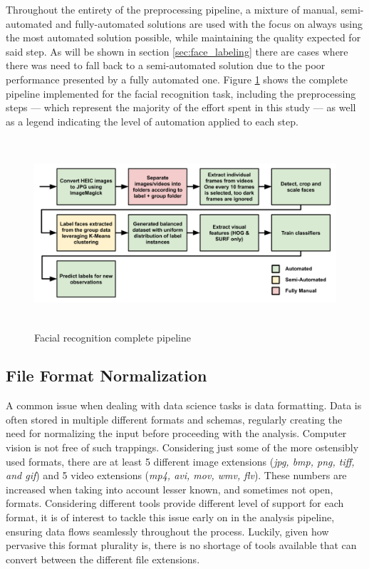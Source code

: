 \documentclass[11pt]{article}
\begin{document}
    Throughout the entirety of the preprocessing pipeline, a mixture of manual, semi-automated and fully-automated solutions are used with the focus on always using the most automated solution possible, while maintaining the quality expected for said step. As will be shown in section \ref{sec:face_labeling} there are cases where there was need to fall back to a semi-automated solution due to the poor performance presented by a fully automated one. Figure \ref{fig:preprocess:pipeline} shows the complete pipeline implemented for the facial recognition task, including the preprocessing steps --- which represent the majority of the effort spent in this study --- as well as a legend indicating the level of automation applied to each step.

    \begin{figure}[ht]
        \centering
        \includegraphics[height=7cm]{./Images/preprocessing/pipeline.png}
        \caption{Facial recognition complete pipeline}
        \label{fig:preprocess:pipeline}
    \end{figure}

    \subsection{File Format Normalization}
        A common issue when dealing with data science tasks is data formatting. Data is often stored in multiple different formats and schemas, regularly creating the need for normalizing the input before proceeding with the analysis. Computer vision is not free of such trappings. Considering just some of the more ostensibly used formats, there are at least 5 different image extensions (\textit{jpg, bmp, png, tiff, and gif}) and 5 video extensions (\textit{mp4, avi, mov, wmv, flv}). These numbers are increased when taking into account lesser known, and sometimes not open, formats. Considering different tools provide different level of support for each format, it is of interest to tackle this issue early on in the analysis pipeline, ensuring data flows seamlessly throughout the process. Luckily, given how pervasive this format plurality is, there is no shortage of tools available that can convert between the different file extensions.
\end{document}
